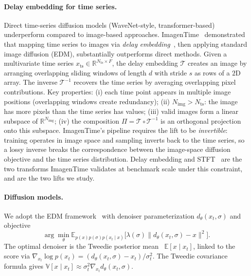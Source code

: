 \documentclass{article}
\theoremstyle{plain}
\theoremstyle{definition}
\theoremstyle{remark}
\newcommand{\tsimg}{\mathcal{T}}
\newcommand{\imgts}{\mathcal{T}^{-1}}
\newcommand{\Nts}{N_{\mathrm{ts}}}
\newcommand{\Nimg}{N_{\mathrm{img}}}
\newcommand{\xts}{x_{\mathrm{ts}}}
\begin{document}
\paragraph{Delay embedding for time series.}
Direct time-series diffusion models (WaveNet-style, transformer-based) underperform compared to image-based approaches. ImagenTime~\citep{naiman2024imagentime} demonstrated that mapping time series to images via \emph{delay embedding}~\citep{takens1981embedding}, then applying standard image diffusion (EDM), substantially outperforms direct methods. Given a multivariate time series $\xts \in \mathbb{R}^{\Nts \times F}$, the delay embedding $\tsimg$ creates an image by arranging overlapping sliding windows of length $d$ with stride $s$ as rows of a $2$D array. The inverse $\imgts$ recovers the time series by averaging overlapping pixel contributions. Key properties: (i) each time point appears in multiple image positions (overlapping windows create redundancy); (ii) $\Nimg > \Nts$: the image has more pixels than the time series has values; (iii) valid images form a linear subspace of $\mathbb{R}^{\Nimg}$; (iv) the composition $\Pi = \tsimg \circ \imgts$ is an orthogonal projection onto this subspace. ImagenTime's pipeline requires the lift to be \emph{invertible}: training operates in image space and sampling inverts back to the time series, so a lossy inverse breaks the correspondence between the image-space diffusion objective and the time series distribution. Delay embedding and STFT~\citep{griffin1984signal} are the two transforms ImagenTime validates at benchmark scale under this constraint, and are the two lifts we study.

\paragraph{Diffusion models.}
We adopt the EDM framework~\citep{karras2022edm} with denoiser parameterization $d_\theta(x_t, \sigma)$ and objective
\begin{equation}
\arg\min_\theta \mathbb{E}_{p(x) p(\sigma) p(x_t \mid x)} \bigl[ \lambda(\sigma) \| d_\theta(x_t, \sigma) - x \|^2 \bigr].
\end{equation}
The optimal denoiser is the Tweedie posterior mean~\citep{tweedie1947functions,efron2011tweedie} $\mathbb{E}[x \mid x_t]$, linked to the score via $\nabla_{x_t} \log p(x_t) = (d_\theta(x_t, \sigma) - x_t)/\sigma_t^2$. The Tweedie covariance formula gives $\mathbb{V}[x \mid x_t] \approx \sigma_t^2 \nabla_{x_t} d_\theta(x_t, \sigma)$.
\end{document}
